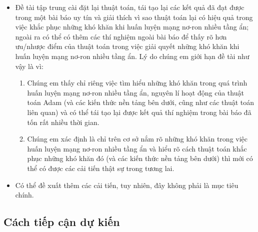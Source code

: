 \documentclass{article}[14pt]
\begin{document}
{    \begin{itemize}
        \item Đề tài tập trung cài đặt lại thuật toán, tái tạo lại các kết quả đã đạt được trong một bài báo uy tín và giải thích vì sao thuật toán lại có hiệu quả trong việc khắc phục những khó khăn khi huấn luyện mạng nơ-ron nhiều tầng ẩn; ngoài ra có thể có thêm các thí nghiệm ngoài bài báo để thấy rõ hơn ưu/nhược điểm của thuật toán trong việc giải quyết những khó khăn khi huấn luyện mạng nơ-ron nhiều tầng ẩn. Lý do chúng em giới hạn đề tài như vậy là vì:
        \begin{enumerate}
            \item Chúng em thấy chỉ riêng việc tìm hiểu những khó khăn trong quá trình huấn luyện mạng nơ-ron nhiều tầng ẩn, nguyên lí hoạt động của thuật toán Adam (và các kiến thức nền tảng bên dưới, cũng như các thuật toán liên quan) và có thể tái tạo lại được kết quả thí nghiệm trong bài báo đã tốn rất nhiều thời gian.
            \item Chúng em xác định là chỉ trên cơ sở nắm rõ những khó khăn trong việc huấn luyện mạng nơ-ron nhiều tầng ẩn và hiểu rõ cách thuật toán khắc phục những khó khăn đó (và các kiến thức nền tảng bên dưới) thì mới có thể có được các cải tiến thật sự trong tương lai.
        \end{enumerate}
   \item Có thể đề xuất thêm các cải tiến, tuy nhiên, đây không phải là mục tiêu chính.
    \end{itemize}
    
    \subsection{Cách tiếp cận dự kiến}
    
    
    
}
\end{document}
